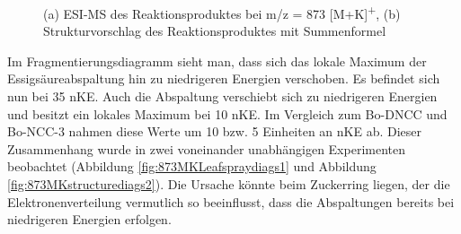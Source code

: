 \begin{figure}[htbp]
  \caption{(a) ESI-MS des Reaktionsproduktes bei m/z = 873 [M+K]\textsuperscript{+}, (b) Strukturvorschlag des Reaktionsproduktes mit Summenformel }
\end{figure}

Im Fragmentierungsdiagramm sieht man, dass sich das lokale Maximum der Essigsäureabspaltung hin zu niedrigeren Energien verschoben. Es befindet sich nun bei  35 \gls{nKE}. Auch die  Abspaltung verschiebt sich zu niedrigeren Energien und besitzt ein lokales Maximum bei 10 \gls{nKE}. Im Vergleich zum Bo-DNCC und Bo-NCC-3 nahmen diese Werte um 10 bzw. 5 Einheiten an \gls{nKE} ab. Dieser Zusammenhang wurde in zwei voneinander unabhängigen Experimenten beobachtet (Abbildung \ref{fig:873MKLeafspraydiags1} und Abbildung \ref{fig:873MKstructurediags2}). Die Ursache könnte beim Zuckerring liegen, der die Elektronenverteilung vermutlich so beeinflusst, dass die Abspaltungen bereits bei niedrigeren Energien erfolgen. 

